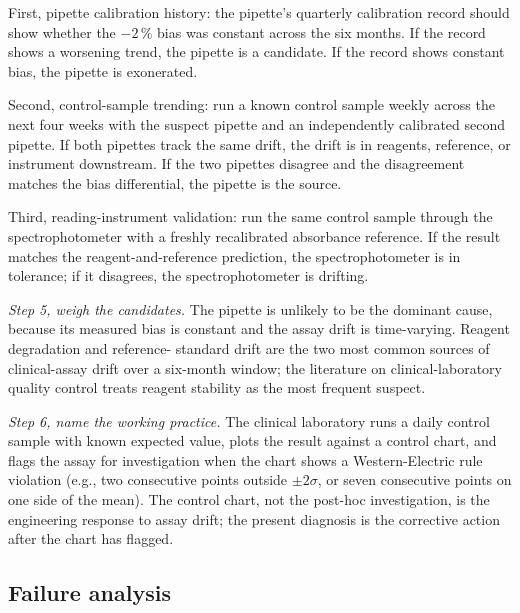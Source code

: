\begin{exercise}
First, pipette calibration history: the pipette's quarterly
calibration record should show whether the $-2\,\%$ bias was constant
across the six months. If the record shows a worsening trend, the
pipette is a candidate. If the record shows constant bias, the
pipette is exonerated.

Second, control-sample trending: run a known control sample weekly
across the next four weeks with the suspect pipette and an
independently calibrated second pipette. If both pipettes track the
same drift, the drift is in reagents, reference, or instrument
downstream. If the two pipettes disagree and the disagreement matches
the bias differential, the pipette is the source.

Third, reading-instrument validation: run the same control sample
through the spectrophotometer with a freshly recalibrated
absorbance reference. If the result matches the reagent-and-reference
prediction, the spectrophotometer is in tolerance; if it disagrees,
the spectrophotometer is drifting.

\textit{Step 5, weigh the candidates.} The pipette is unlikely to be
the dominant cause, because its measured bias is constant and the
assay drift is time-varying. Reagent degradation and reference-
standard drift are the two most common sources of clinical-assay
drift over a six-month window; the literature on clinical-laboratory
quality control treats reagent stability as the most frequent
suspect.

\textit{Step 6, name the working practice.} The clinical laboratory
runs a daily control sample with known expected value, plots the
result against a control chart, and flags the assay for investigation
when the chart shows a Western-Electric rule violation (e.g., two
consecutive points outside $\pm 2\sigma$, or seven consecutive points
on one side of the mean). The control chart, not the post-hoc
investigation, is the engineering response to assay drift; the
present diagnosis is the corrective action after the chart has
flagged.
\end{exercise}

\subsection*{Failure analysis}

